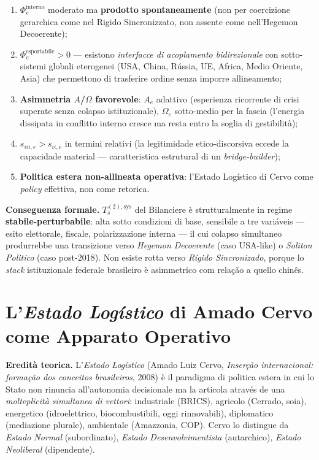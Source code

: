 \begin{enumerate}
\def\labelenumi{\arabic{enumi}.}
\tightlist
\item
  \(\Phi_e^{\text{interno}}\) moderato ma \textbf{prodotto
  spontaneamente} (non per coercizione gerarchica come nel Rigido
  Sincronizzato, non assente come nell'Hegemon Decoerente);
\item
  \(\Phi_e^{\text{esportabile}} > 0\) --- esistono \emph{interfacce di
  acoplamento bidirezionale} con sotto-sistemi globali eterogenei
  (USA, China, Rússia, UE, Africa, Medio Oriente, Asia) che permettono di
  trasferire ordine senza imporre allineamento;
\item
  \textbf{Asimmetria \(A\)/\(\Omega\) favorevole}: \(A_e\) adattivo
  (esperienza ricorrente di crisi superate senza colapso
  istituzionale), \(\Omega_e\) sotto-medio per la fascia (l'energia
  dissipata in conflitto interno cresce ma resta entro la soglia di
  gestibilità);
\item
  \(s_{iii,e} > s_{ii,e}\) in termini relativi (la legitimidade
  etico-discorsiva eccede la capacidade material --- caratteristica
  estrutural di un \emph{bridge-builder});
\item
  \textbf{Politica estera non-allineata operativa}: l'Estado Logístico
  di Cervo come \emph{policy} effettiva, non come retorica.
\end{enumerate}

\Proved{} \textbf{Conseguenza formale.} \(T_s^{(2),\text{sys}}\) del
Bilanciere è strutturalmente in regime \textbf{stabile-perturbabile}:
alta sotto condizioni di base, sensibile a tre variáveis --- esito
elettorale, fiscale, polarizzazione interna --- il cui colapso
simultaneo produrrebbe una transizione verso \emph{Hegemon Decoerente}
(caso USA-like) o \emph{Soliton Politico} (caso post-2018). Non esiste
rotta verso \emph{Rígido Sincronizado}, porque lo \emph{stack}
istituzionale federale brasileiro è asimmetrico com relação a quello
chinês.



\section{\texorpdfstring{L'\emph{Estado Logístico} di Amado Cervo come
Apparato
Operativo}{L'Estado Logístico di Amado Cervo come Apparato Operativo}}\label{lestado-loguxedstico-di-amado-cervo-come-apparato-operativo}

\Hypoth{} \textbf{Eredità teorica.} L'\emph{Estado Logístico} (Amado
Luiz Cervo, \emph{Inserção internacional: formação dos conceitos
brasileiros}, 2008) è il paradigma di politica estera in cui lo Stato
non rinuncia all'autonomia decisionale ma la articola através de una
\emph{molteplicità simultanea di vettori}: industriale (BRICS), agricolo
(Cerrado, soia), energetico (idroelettrico, biocombustibili, oggi
rinnovabili), diplomatico (mediazione plurale), ambientale (Amazzonia,
COP). Cervo lo distingue da \emph{Estado Normal} (subordinato),
\emph{Estado Desenvolvimentista} (autarchico), \emph{Estado Neoliberal}
(dipendente).

